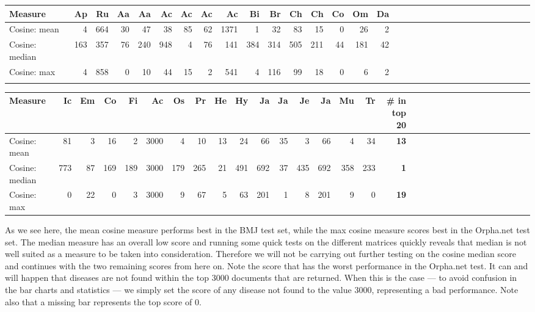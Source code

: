 \begin{table}[H]
  \begin{tiny}
    \begin{tabular}{|l|r|r|r|r|r|r|r|r|r|r|r|r|r|r|r|r|r|r|r|r|r|r|r|r|r|r|r|r|r|r|r|}
      \hline
      Measure &Ap&Ru&Aa&Aa&Ac&Ac&Ac&Ac&Bi&Br&Ch&Ch&Co&Om&Da\\
      \hline
      Cosine: mean & 4 & 664 & 30 & 47 & 38 & 85 & 62 & 1371 & 1 & 32 & 83 & 15 & 0 & 26 & 2 \\
      \hline
      Cosine: median & 163 & 357 & 76 & 240 & 948 & 4 & 76 & 141 & 384 & 314 & 505 & 211 & 44 & 181 & 42 \\
      \hline
      Cosine: max & 4 & 858 & 0 & 10 & 44 & 15 & 2 & 541 & 4 & 116 & 99 & 18 & 0 & 6 & 2\\
      \hline
      \multicolumn{16}{c}{} \\
    \end{tabular}
    \begin{tabular}{|l|r|r|r|r|r|r|r|r|r|r|r|r|r|r|r|r|r|r|r|r|r|r|r|r|r|r|r|r|r|r|}
      \hline
      Measure &Ic&Em&Co&Fi&Ac&Os&Pr&He&Hy&Ja&Ja&Je&Ja&Mu&Tr &  \scriptsize{\textbf{\# in top 20}} \\
      \hline
      Cosine: mean & 81 & 3 & 16 & 2 & 3000 & 4 & 10 & 13 & 24 & 66 & 35 & 3 & 66 & 4 & 34 & \scriptsize{\textbf{13}} \\
      \hline
      Cosine: median & 773 & 87 & 169 & 189 & 3000 & 179 & 265 & 21 & 491 & 692 & 37 & 435 & 692 & 358 & 233 & \scriptsize{\textbf{1}} \\
      \hline
      Cosine: max  & 0 & 22 & 0 & 3 & 3000 & 9 & 67 & 5 & 63 & 201 & 1 & 8 & 201 & 9 & 0 & \scriptsize{\textbf{19}} \\
      \hline
    \end{tabular}
  \end{tiny}
\end{table}

As we see here, the mean cosine measure performs best in the BMJ test
set, while the max cosine measure scores best in the Orpha.net test
set. The median measure has an overall low score and running some
quick tests on the different matrices quickly reveals that median is
not well suited as a measure to be taken into consideration. Therefore we
will not be carrying out further testing on the cosine median score and continues
with the two remaining scores from here on. Note the score that
has the worst performance in the Orpha.net test. It can and will
happen that diseases are not found within the top 3000 documents that
are returned. When this is the case --- to avoid confusion in the bar
charts and statistics --- we simply set the score of any disease not
found to the value 3000, representing a bad performance. Note also
that a missing bar represents the top score of 0.

